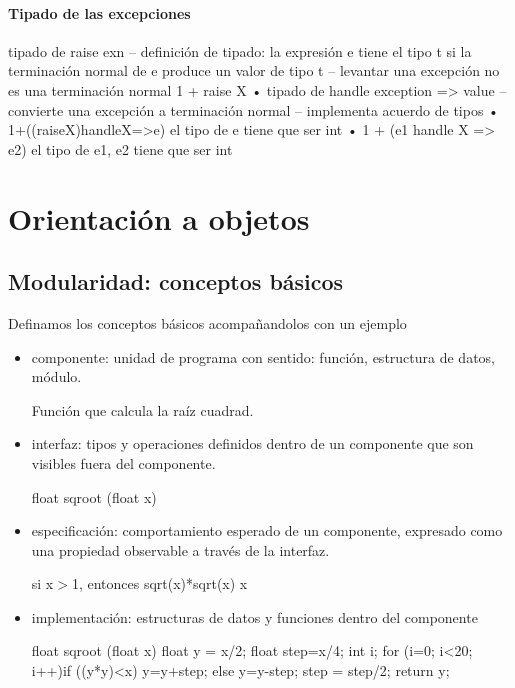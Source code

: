 \documentclass[10pt,a4paper]{report}
\begin{document}
\subsubsection{Tipado de las excepciones}

tipado de raise exn
–  definición de tipado: la expresión e tiene el tipo t si la terminación normal de e produce un valor de tipo t 
–  levantar una excepción no es una terminación normal 1 + raise X 
•  tipado de handle exception => value
–  convierte una excepción a terminación normal
–  implementa acuerdo de tipos • 1+((raiseX)handleX=>e)  
el tipo de e tiene que ser int •  1 + (e1 handle X => e2)
el tipo de e1, e2 tiene que ser int

\chapter{Orientación a objetos}

\section{Modularidad: conceptos básicos}
\par Definamos los conceptos básicos acompañandolos con un ejemplo
\begin{itemize}
    \item componente: unidad de programa con sentido: función, estructura de 
    datos, módulo.
    
    Función que calcula la raíz cuadrad.
    \item interfaz: tipos y operaciones definidos dentro de un componente que son 
    visibles fuera del componente.
    
      float sqroot (float x) 
    \item especificación: comportamiento esperado de un componente, expresado 
    como una propiedad observable a través de la interfaz.
    
    si x$>$1, entonces sqrt(x)*sqrt(x) x 
    \item implementación: estructuras de datos y funciones dentro del componente

   float sqroot (float x){ 
       float y = x/2; float step=x/4; int i; 
       for (i=0; i<20; i++){if ((y*y)<x) y=y+step; else y=y-step;
      step = step/2;} 
return y;  }
\end{itemize}
\end{document}
